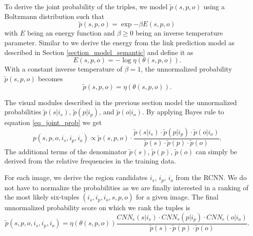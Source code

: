 \documentclass[runningheads,a4paper]{llncs}
\begin{document}
To derive the joint probability of the triples, we model $\tilde{p}(s, p, o)$ using a Boltzmann distribution such that
\begin{equation}
\tilde{p}(s, p, o) = \exp{-\beta E(s,p,o)}
\end{equation}
with $E$ being an energy function and $\beta \geq 0$ being an inverse temperature parameter. Similar to \cite{tensorbrain} we derive the energy from the link prediction model as described in Section \ref{section_model_semantic} and define it as 
\begin{equation}
E(s,p,o) = -\log \eta(\theta(s,p,o)).
\end{equation}
With a constant inverse temperature of $\beta = 1$, the unnormalized probability $\tilde{p}(s, p, o)$ becomes
\begin{equation}
\tilde{p}(s, p, o) = \eta(\theta(s,p,o)).
\end{equation}

The visual modules described in the previous section model the unnormalized probabilities $\tilde{p}(s | i_s)$, $\tilde{p}(p | i_p)$, and $\tilde{p}(o | i_o)$. By applying Bayes rule to equation \ref{eq_joint_prob} we get
\begin{equation}
p(s, p, o, i_s, i_p, i_o) \propto \tilde{p}(s,p,o) \cdot \frac{\tilde{p}(s | i_s) \cdot \tilde{p}(p | i_p) \cdot \tilde{p}(o | i_o) }{\tilde{p}(s) \cdot \tilde{p}(p) \cdot \tilde{p}(o)}.
\end{equation}
The additional terms of the denominator $\tilde{p}(s)$, $\tilde{p}(p)$, $\tilde{p}(o)$ can simply be derived from the relative frequencies in the training data.

For each image, we derive the region candidates $i_s$, $i_p$, $i_o$ from the RCNN. We do not have to normalize the probabilities as we are finally interested in a ranking of the most likely six-tuples $(i_s, i_p, i_o, s, p, o)$ for a given image. The final unnormalized probability score on which we rank the tuples is
\begin{equation}
\tilde{p}(s, p, o, i_s, i_p, i_o) =  \eta(\theta(s,p,o))  \frac{\textit{CNN}_e(s | i_s) \cdot \textit{CNN}_r(p | i_p) \cdot \textit{CNN}_e(o | i_o) }{ \tilde{p}(s) \cdot \tilde{p}(p) \cdot \tilde{p}(o)}.
\label{eq_ranking}
\end{equation}



\end{document}
